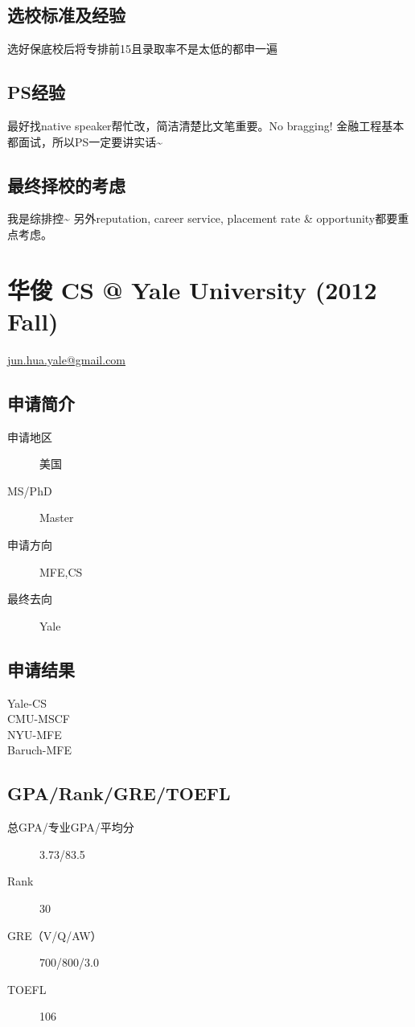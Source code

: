 \documentclass[11pt,fleqn,openany]{book} %
\begin{document}
\subsection*{选校标准及经验}
选好保底校后将专排前15且录取率不是太低的都申一遍
\subsection*{PS经验}
最好找native speaker帮忙改，简洁清楚比文笔重要。No bragging! 金融工程基本都面试，所以PS一定要讲实话\textasciitilde{}
\subsection*{最终择校的考虑}
我是综排控\textasciitilde{}
另外reputation, career service, placement rate \& opportunity都要重点考虑。
\clearpage
\section{华俊 CS @ Yale University (2012 Fall)}
\hfill \href{mailto:jun.hua.yale@gmail.com}{jun.hua.yale@gmail.com}

\noindent\begin{minipage}[t]{0.45\textwidth}
\subsection*{申请简介}
\begin{description}
\item[申请地区] 美国
\item[MS/PhD] Master
\item[申请方向] MFE,CS
\item[最终去向] Yale
\end{description}
\end{minipage}
\hfill
\begin{minipage}[t]{0.45\textwidth}
\subsection*{申请结果}
\noindent Yale-CS\\
CMU-MSCF\\
NYU-MFE\\
Baruch-MFE
\end{minipage}
\subsection*{GPA/Rank/GRE/TOEFL}
\begin{description}
\item[总GPA/专业GPA/平均分] 3.73/83.5
\item[Rank] 30
\item[GRE（V/Q/AW）] 700/800/3.0
\item[TOEFL] 106
\end{description}
\end{document}
